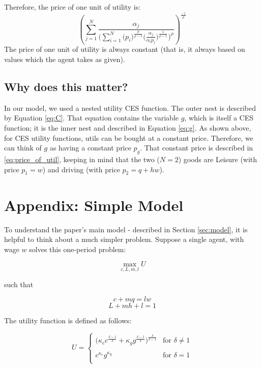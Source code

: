 \documentclass[letter, 12pt, epsf,leqno]{article}
\begin{document}
Therefore, the price of one unit of utility is:
\begin{equation}
\left( \sum_{j=1}^N  \frac{\alpha_j}{\Bigg(\sum_{i=1}^N \Big(p_i\Big)^\frac{\rho}{\rho-1} \Big( \frac {\alpha_j }{\alpha_i p_j} \Big) ^\frac{1}{\rho-1}\Bigg)^\rho}\right)^\frac{-1}{\rho} 
\label{eq:price_of_util}
\end{equation}
The price of one unit of utility is always constant (that is, it always based on values which the agent takes as given).

\subsection{Why does this matter?}

In our model, we used a nested utility CES function.  The outer nest is described by Equation \ref{eq:C}.  That equation contains the variable $g$, which is itself a CES function; it is the inner nest and described in Equation \ref{eq:g}.  As shown above, for CES utility functions, utils can be bought at a constant price.  Therefore, we can think of $g$ as having a constant price $p_g$.  That constant price is described in \ref{eq:price_of_util}, keeping in mind that the two ($N=2$) goods are Leisure (with price $p_1= w$) and driving (with price $p_2 = q+hw$).



\section{Appendix: Simple Model}\label{sec:simplified}

To understand the paper's main model - described in Section \ref{sec:model}, it is helpful to think about a much simpler problem.
Suppose a single agent, with wage $w$ solves this one-period problem:

\begin{equation}\max_{c, L, m, l} U\end{equation}

such that

\begin{equation}c + mq  = lw\end{equation}
\begin{equation}L + mh + l = 1\end{equation}

The utility function is defined as follows:

\begin{equation}U=
   \begin{cases} 
       \Bigg(\kappa_c c^\frac{\delta-1}{\delta} + \kappa_g g^\frac{\delta-1}{\delta} \Bigg)^\frac{\delta}{\delta-1}& \text{for } \delta \ne 1 \\
      \\
     c^{\kappa_c}g^{\kappa_g} & \text{for } \delta = 1\\ 
   \end{cases}
\end{equation}
\end{document}
